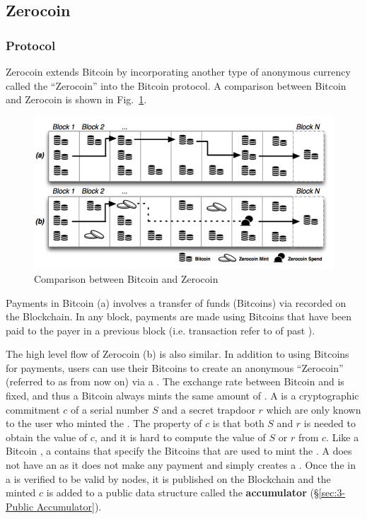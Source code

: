 \subsection{Zerocoin}
\subsubsection{Protocol}
\label{sec:2-Zerocoin Protocol}
Zerocoin extends Bitcoin by incorporating another type of anonymous currency called the “Zerocoin” into the Bitcoin protocol. A comparison between Bitcoin and Zerocoin is shown in Fig.~\ref{fig:zerocoin_overview}.

\begin{figure}[H]
	\begin{center}
		\includegraphics[scale=0.7]{zerocoin-overview} 
		\caption{Comparison between Bitcoin and Zerocoin \cite{Miers2013}}
		\label{fig:zerocoin_overview} 
	\end{center}
\end{figure}

Payments in Bitcoin (a) involves a transfer of funds (Bitcoins) via  recorded on the Blockchain. In any block, payments are made using Bitcoins that have been paid to the payer in a previous block (i.e. transaction  refer to  of past ).
 
The high level flow of Zerocoin (b) is also similar. In addition to using Bitcoins for payments, users can use their Bitcoins to create an anonymous “Zerocoin” (referred to as \kwCoin{} from now on) via a . The exchange rate between Bitcoin and \kwCoin{} is fixed, and thus a Bitcoin always mints the same amount of \kwCoin{}. A \kwCoin{} is a cryptographic commitment $c$ of a serial number $S$ and a secret trapdoor $r$ which are only known to the user who minted the \kwCoin{}. The property of $c$ is that both $S$ and $r$ is needed to obtain the value of $c$, and it is hard to compute the value of $S$ or $r$ from $c$. Like a Bitcoin \kwTransaction{}{}, a  contains  that specify the Bitcoins that are used to mint the \kwCoin{}. A  does not have an \kwOutput{} as it does not make any payment and simply creates a \kwCoin{}. Once the \kwInput{} in a  is verified to be valid by nodes, it is published on the Blockchain and the minted \kwCoin{} $c$ is added to a public data structure called the \textbf{accumulator} (\S\ref{sec:3-Public Accumulator}). 

